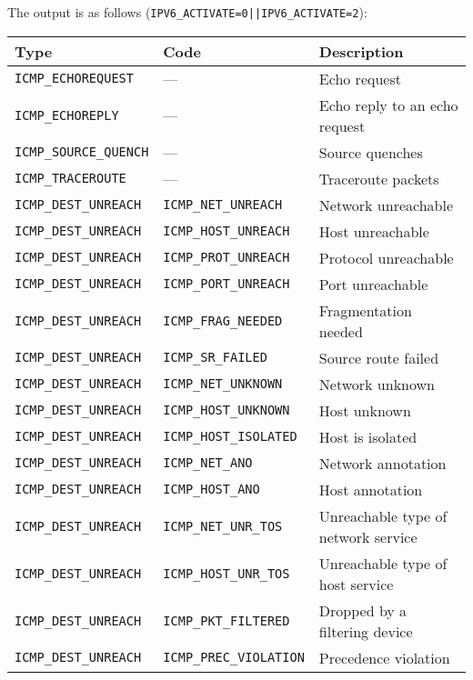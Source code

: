 \documentclass[documentation]{subfiles}
\begin{document}
The output is as follows ({\tt IPV6\_ACTIVATE=0||IPV6\_ACTIVATE=2}):
\begin{longtable}{lll}
    \toprule
    {\bf Type}                 & {\bf Code}                  & {\bf Description}\\
    \midrule\endhead%
    {\tt ICMP\_ECHOREQUEST}    & ---                         & Echo request \\
    {\tt ICMP\_ECHOREPLY}      & ---                         & Echo reply to an echo request \\
    {\tt ICMP\_SOURCE\_QUENCH} & ---                         & Source quenches \\
    {\tt ICMP\_TRACEROUTE}     & ---                         & Traceroute packets\\
    {\tt ICMP\_DEST\_UNREACH}  & {\tt ICMP\_NET\_UNREACH}    & Network unreachable \\
    {\tt ICMP\_DEST\_UNREACH}  & {\tt ICMP\_HOST\_UNREACH}   & Host unreachable \\
    {\tt ICMP\_DEST\_UNREACH}  & {\tt ICMP\_PROT\_UNREACH}   & Protocol unreachable \\
    {\tt ICMP\_DEST\_UNREACH}  & {\tt ICMP\_PORT\_UNREACH}   & Port unreachable \\
    {\tt ICMP\_DEST\_UNREACH}  & {\tt ICMP\_FRAG\_NEEDED}    & Fragmentation needed \\
    {\tt ICMP\_DEST\_UNREACH}  & {\tt ICMP\_SR\_FAILED}      & Source route failed \\
    {\tt ICMP\_DEST\_UNREACH}  & {\tt ICMP\_NET\_UNKNOWN}    & Network unknown \\
    {\tt ICMP\_DEST\_UNREACH}  & {\tt ICMP\_HOST\_UNKNOWN}   & Host unknown \\
    {\tt ICMP\_DEST\_UNREACH}  & {\tt ICMP\_HOST\_ISOLATED}  & Host is isolated \\
    {\tt ICMP\_DEST\_UNREACH}  & {\tt ICMP\_NET\_ANO}        & Network annotation \\
    {\tt ICMP\_DEST\_UNREACH}  & {\tt ICMP\_HOST\_ANO}       & Host annotation \\
    {\tt ICMP\_DEST\_UNREACH}  & {\tt ICMP\_NET\_UNR\_TOS}   & Unreachable type of network service \\
    {\tt ICMP\_DEST\_UNREACH}  & {\tt ICMP\_HOST\_UNR\_TOS}  & Unreachable type of host service \\
    {\tt ICMP\_DEST\_UNREACH}  & {\tt ICMP\_PKT\_FILTERED}   & Dropped by a filtering device \\
    {\tt ICMP\_DEST\_UNREACH}  & {\tt ICMP\_PREC\_VIOLATION} & Precedence violation \\

\end{longtable}
\end{document}
